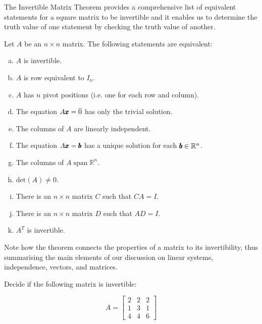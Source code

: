 The Invertible Matrix Theorem provides a comprehensive list of equivalent statements for a square matrix to be invertible and it enables us to determine the truth value of one statement by checking the truth value of another.

\newpage

\begin{theorem}
    Let \( A \) be an \( n \times n \) matrix. The following statements are equivalent:
    \begin{enumerate}[(a)]
        \item $A$ is invertible.
        \item $A$ is row equivalent to $I_n$.
        \item $A$ has $n$ pivot positions (i.e. one for each row and column).
        \item The equation $A \pmb{x}=\overline{0}$ has only the trivial solution.
        \item The columns of $A$ are linearly independent.
        \item The equation \( A \pmb{x} = \pmb{b} \) has a unique solution for each \( \pmb{b} \in \mathbb{R}^n \).
        \item The columns of $A \operatorname{span} \mathbb{R}^n$.
        \item \( \text{det}(A) \neq 0 \).
        \item There is an $n \times n$ matrix $C$ such that $C A=I$.
        \item There is an $n \times n$ matrix $D$ such that $A D=I$.
        \item $A^T$ is invertible.
    \end{enumerate}
\end{theorem}

Note how the theorem connects the properties of a matrix to its invertibility, thus summarising the main elements of our discussion on linear systems, independence, vectors, and matrices.

\begin{example} Decide if the following matrix is invertible:

\[
A=\left[\begin{array}{lll}
2 & 2 & 2 \\
1 & 3 & 1 \\
4 & 4 & 6
\end{array}\right]
\]

\end{example}

